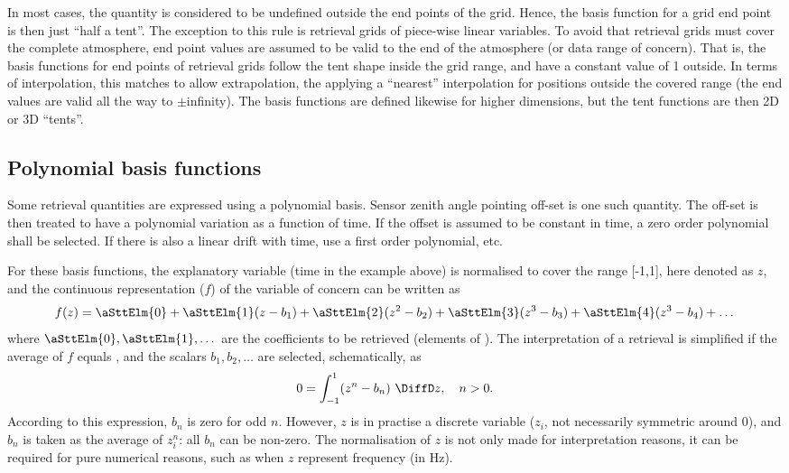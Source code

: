 In most cases, the quantity is considered to be undefined outside the end
points of the grid. Hence, the basis function for a grid end point is then just
``half a tent''. The exception to this rule is retrieval grids of piece-wise
linear variables. To avoid that retrieval grids must cover the complete
atmosphere, end point values are assumed to be valid to the end of the
atmosphere (or data range of concern). That is, the basis functions for end
points of retrieval grids follow the tent shape inside the grid range, and
have a constant value of 1 outside. In terms of interpolation, this matches to
allow extrapolation, the applying a ``nearest'' interpolation for positions
outside the covered range (the end values are valid all the way to
$\pm$infinity).
The basis functions are defined likewise for higher dimensions, but the
tent functions are then 2D or 3D ``tents''.




\subsection{Polynomial basis functions}
\label{sec:wfuns:basis2}
%
Some retrieval quantities are expressed using a polynomial basis. Sensor zenith
angle pointing off-set is one such quantity. The off-set is then treated to
have a polynomial variation as a function of time. If the offset is assumed to
be constant in time, a zero order polynomial shall be selected. If there is
also a linear drift with time, use a first order polynomial, etc.

For these basis functions, the explanatory variable (time in the example above)
is normalised to cover the range [-1,1], here denoted as $z$, and the
continuous representation ($f$) of the variable of concern can be written as
\begin{equation}
  f(z) = \aSttElm{0} + \aSttElm{1}(z-b_1) + \aSttElm{2}(z^2-b_2) + 
                     \aSttElm{3}(z^3-b_3) + \aSttElm{4}(z^3-b_4) + \dots  
\end{equation}
where $\aSttElm{0}, \aSttElm{1}, \dots$ are the coefficients to be retrieved
(elements of \SttVct). The interpretation of a retrieval is simplified if the
average of $f$ equals , and the scalars $b_1, b_2, \dots$ are
selected, schematically, as
\begin{equation}
  0 = \int_{-1}^1 \!\left(z^n-b_n\right) \, \DiffD z, \quad n>0.
\end{equation}
According to this expression, $b_n$ is zero for odd $n$. However, $z$ is in
practise a discrete variable ($z_i$, not necessarily symmetric around 0), and
$b_n$ is taken as the average of $z_i^n$: all $b_n$ can be non-zero. The
normalisation of $z$ is not only made for interpretation reasons, it can be
required for pure numerical reasons, such as when $z$ represent frequency (in
Hz).


